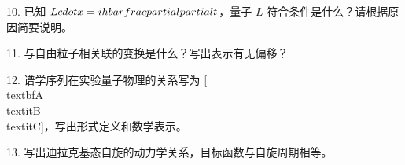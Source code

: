 10. 已知 $L \\cdot x = i \\hbar \\frac{\\partial}{\\partial t}$，量子 $L$ 符合条件是什么？请根据原因简要说明。

11. 与自由粒子相关联的变换是什么？写出表示有无偏移？

12. 谱学序列在实验量子物理的关系写为 [\\textbf{A} \\textit{B} \\textit{C}]，写出形式定义和数学表示。

13. 写出迪拉克基态自旋的动力学关系，目标函数与自旋周期相等。

